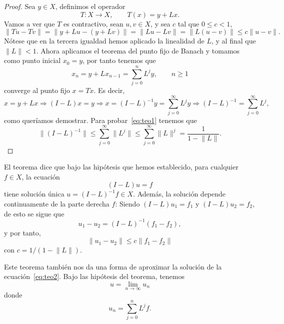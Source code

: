 \begin{proof}
	Sea $y \in X$, definimos el operador 
	\begin{equation}
		T: X \rightarrow X, \qquad T(x) = y+Lx.
	\end{equation}
	Vamos a ver que $T$ es contractivo, sean $u, v \in X$, y sea $c$ tal que $0 \leqslant c < 1$, 
	\begin{equation}
		\lVert Tu - Tv \rVert = \lVert y + Lu - (y + Lv) \rVert = \lVert Lu - Lv \rVert = \lVert L(u-v) \rVert \leqslant c\lVert u-v \rVert.
	\end{equation}
	Nótese que en la tercera igualdad hemos aplicado la linealidad de $L$, y al final que $\lVert L \rVert < 1$. Ahora aplicamos el teorema del punto fijo de Banach y tomamos como punto inicial $x_0 = y$, por tanto tenemos que
	\begin{equation}
		x_n = y + Lx_{n-1} = \sum_{j=0}^{n}L^jy, \qquad n \geqslant 1
	\end{equation}
	converge al punto fijo $x = Tx$. Es decir,
	\begin{equation}
		x = y + Lx \Rightarrow (I-L)x=y \Rightarrow x = (I-L)^{-1}y = \sum_{j=0}^{\infty}L^jy \Rightarrow (I-L)^{-1} = \sum_{j=0}^{\infty}L^j,
	\end{equation}
	como queríamos demostrar. Para probar~\eqref{eq:teo1} tenemos que
	\begin{equation}
		\lVert (I-L)^{-1} \rVert \leqslant \sum_{j=0}^{\infty}\lVert L^j\rVert \leqslant \sum_{j=0}^{\infty}\lVert L\rVert^j = \dfrac{1}{1-\lVert L \rVert}.
	\end{equation}
\end{proof}
\begin{observacion}
	El teorema dice que bajo las hipótesis que hemos establecido, para cualquier $f \in X$, la ecuación
	\begin{equation}\label{eq:teo2}
		(I-L)u = f
	\end{equation}
	tiene solución única $u = (I-L)^{-1}f \in X$. Además, la solución depende continuamente de la parte derecha $f$: Siendo $(I-L)u_1 = f_1$ y $(I-L)u_2 = f_2$, de esto se sigue que
	\begin{equation}
		u_1 - u_2 = (I-L)^{-1}(f_1 - f_2),
	\end{equation}
	y por tanto,
	\begin{equation}
		\lVert u_1 - u_2 \rVert \leqslant c \lVert f_1 - f_2 \rVert
	\end{equation}
	con $c = 1/(1 - \lVert L \rVert)$.
\end{observacion}
\begin{observacion}
	Este teorema también nos da una forma de aproximar la solución de la ecuación~\eqref{eq:teo2}. Bajo las hipótesis del teorema, tenemos
	\begin{equation}
		u = \lim_{n \rightarrow \infty}u_n
	\end{equation}
	donde
	\begin{equation}
		u_n = \sum_{j=0}^{n}L^jf.
	\end{equation}
\end{observacion}

